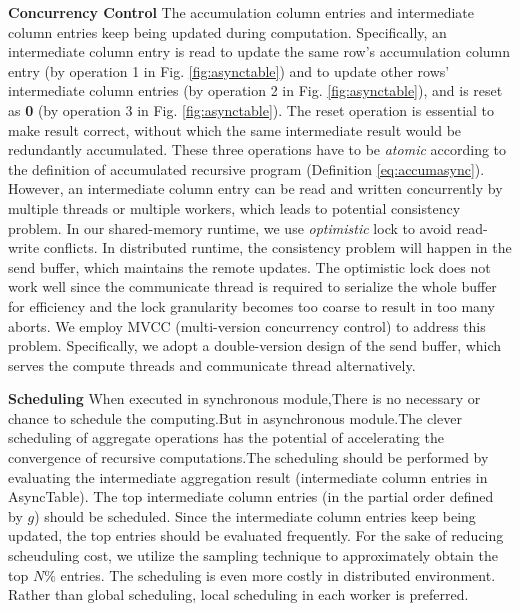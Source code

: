 \noindent\textbf{Concurrency Control}
The accumulation column entries and intermediate column entries keep being updated during computation. Specifically, an intermediate column entry is read to update the same row's accumulation column entry (by operation 1 in Fig. \ref{fig:asynctable}) and to update other rows' intermediate column entries (by operation 2 in Fig. \ref{fig:asynctable}), and is reset as \textbf{0} (by operation 3 in Fig. \ref{fig:asynctable}). The reset operation is essential to make result correct, without which the same intermediate result would be redundantly accumulated. These three operations have to be \emph{atomic} according to the definition of accumulated recursive program (Definition \ref{eq:accumasync}). However, an intermediate column entry can be read and written concurrently by multiple threads or multiple workers, which leads to potential consistency problem. In our shared-memory runtime, we use \emph{optimistic} lock to avoid read-write conflicts. In distributed runtime, the consistency problem will happen in the send buffer, which maintains the remote updates. The optimistic lock does not work well since the communicate thread is required to serialize the whole buffer for efficiency and the lock granularity becomes too coarse to result in too many aborts. We employ MVCC (multi-version concurrency control) to address this problem. Specifically, we adopt a double-version design of the send buffer, which serves the compute threads and communicate thread alternatively.


\noindent\textbf{Scheduling}
When executed in synchronous module,There is no necessary or chance to schedule the computing.But in asynchronous module.The clever scheduling of aggregate operations has the potential of accelerating the convergence of recursive computations.The scheduling should be performed by evaluating the intermediate aggregation result (intermediate column entries in AsyncTable). The top intermediate column entries (in the partial order defined by $g$) should be scheduled. Since the intermediate column entries keep being updated, the top entries should be evaluated frequently. For the sake of reducing scheuduling cost, we utilize the sampling technique \cite{Zhang:2011:PDF:2038916.2038929} to approximately obtain the top $N\%$ entries. The scheduling is even more costly in distributed environment. Rather than global scheduling, local scheduling in each worker is preferred.

